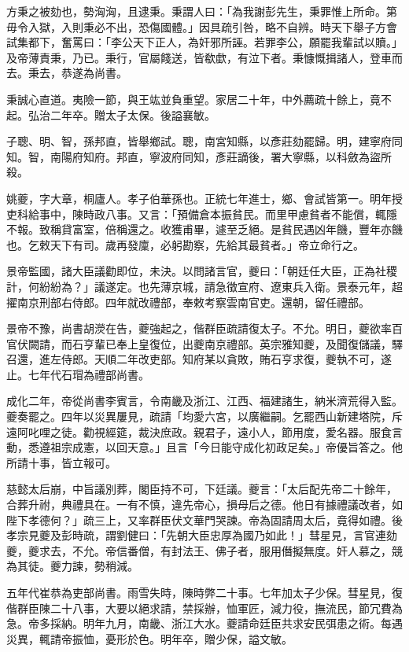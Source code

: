 \begin{pinyinscope}
方秉之被劾也，勢洶洶，且逮秉。秉謂人曰：「為我謝彭先生，秉罪惟上所命。第毋令入獄，入則秉必不出，恐傷國體。」因具疏引咎，略不自辨。時天下舉子方會試集都下，奮罵曰：「李公天下正人，為奸邪所誣。若罪李公，願罷我輩試以贖。」及帝薄責秉，乃已。秉行，官屬餞送，皆欷歔，有泣下者。秉慷慨揖諸人，登車而去。秉去，恭遂為尚書。

秉誠心直道。夷險一節，與王竑並負重望。家居二十年，中外薦疏十餘上，竟不起。弘治二年卒。贈太子太保。後謚襄敏。

子聰、明、智，孫邦直，皆舉鄉試。聰，南宮知縣，以彥莊劾罷歸。明，建寧府同知。智，南陽府知府。邦直，寧波府同知，彥莊謫後，署大寧縣，以科斂為盜所殺。

姚夔，字大章，桐廬人。孝子伯華孫也。正統七年進士，鄉、會試皆第一。明年授吏科給事中，陳時政八事。又言：「預備倉本振貧民。而里甲慮貧者不能償，輒隱不報。致稱貸富室，倍稱還之。收獲甫畢，遽至乏絕。是貧民遇凶年饑，豐年亦饑也。乞敕天下有司。歲再發廩，必躬勘察，先給其最貧者。」帝立命行之。

景帝監國，諸大臣議勸即位，未決。以問諸言官，夔曰：「朝廷任大臣，正為社稷計，何紛紛為？」議遂定。也先薄京城，請急徵宣府、遼東兵入衛。景泰元年，超擢南京刑部右侍郎。四年就改禮部，奉敕考察雲南官吏。還朝，留任禮部。

景帝不豫，尚書胡濙在告，夔強起之，偕群臣疏請復太子。不允。明日，夔欲率百官伏闕請，而石亨輩已奉上皇復位，出夔南京禮部。英宗雅知夔，及聞復儲議，驛召還，進左侍郎。天順二年改吏部。知府某以貪敗，賄石亨求復，夔執不可，遂止。七年代石瑁為禮部尚書。

成化二年，帝從尚書李賓言，令南畿及浙江、江西、福建諸生，納米濟荒得入監。夔奏罷之。四年以災異屢見，疏請「均愛六宮，以廣繼嗣。乞罷西山新建塔院，斥遠阿叱哩之徒。勸視經筵，裁決庶政。親君子，遠小人，節用度，愛名器。服食言動，悉遵祖宗成憲，以回天意。」且言「今日能守成化初政足矣。」帝優旨答之。他所請十事，皆立報可。

慈懿太后崩，中旨議別葬，閣臣持不可，下廷議。夔言：「太后配先帝二十餘年，合葬升祔，典禮具在。一有不慎，違先帝心，損母后之德。他日有據禮議改者，如陛下孝德何？」疏三上，又率群臣伏文華門哭諫。帝為固請周太后，竟得如禮。後孝宗見夔及彭時疏，謂劉健曰：「先朝大臣忠厚為國乃如此！」彗星見，言官連劾夔，夔求去，不允。帝信番僧，有封法王、佛子者，服用僭擬無度。奸人慕之，競為其徒。夔力諫，勢稍減。

五年代崔恭為吏部尚書。雨雪失時，陳時弊二十事。七年加太子少保。彗星見，復偕群臣陳二十八事，大要以絕求請，禁採辦，恤軍匠，減力役，撫流民，節冗費為急。帝多採納。明年九月，南畿、浙江大水。夔請命廷臣共求安民弭患之術。每遇災異，輒請帝振恤，憂形於色。明年卒，贈少保，謚文敏。


\end{pinyinscope}
